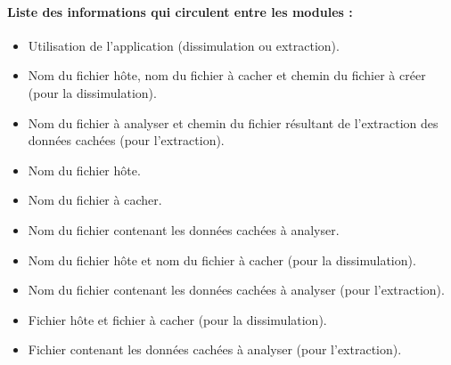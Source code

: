 \documentclass[11pt]{article}
\begin{document}
\paragraph{Liste des informations qui circulent entre les modules :}

\begin{multicols}{2}
\begin{description}
\small
\item[1)] 
\begin{itemize}
\item Utilisation de l'application (dissimulation ou extraction).
\item Nom du fichier hôte, nom du fichier à cacher et chemin du fichier à créer
    (pour la dissimulation).
\item Nom du fichier à analyser et chemin du fichier résultant de l'extraction
    des données cachées (pour l'extraction).
\end{itemize}
\item[2)] 
\begin{itemize}
\item Nom du fichier hôte.
\item Nom du fichier à cacher.
\end{itemize}
\item[3)] 
\begin{itemize}
\item Nom du fichier contenant les données cachées à analyser.
\end{itemize}
\item[4)] 
\begin{itemize}
\item Nom du fichier hôte et nom du fichier à cacher (pour la dissimulation).
\item Nom du fichier contenant les données cachées à analyser (pour
    l'extraction).
\end{itemize}
\item[5)]
\begin{itemize}
\item Fichier hôte et fichier à cacher (pour la dissimulation).
\item Fichier contenant les données cachées à analyser (pour l'extraction).
\end{itemize}
\item[6)]

\end{description}
\end{multicols}
\end{document}
